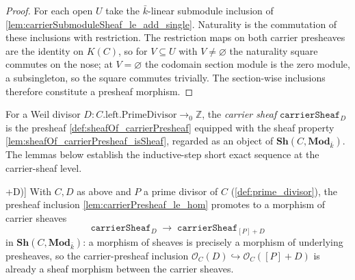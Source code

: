 \begin{proof}
  \leanok
  For each open \(U\) take the \(\bar k\)-linear submodule inclusion of
  \cref{lem:carrierSubmoduleSheaf_le_add_single}. Naturality is the
  commutation of these inclusions with restriction. The restriction maps on
  both carrier presheaves are the identity on \(K(C)\), so for
  \(V \subseteq U\) with \(V \neq \varnothing\) the naturality square
  commutes on the nose; at \(V = \varnothing\) the codomain section module is
  the zero module, a subsingleton, so the square commutes trivially. The
  section-wise inclusions therefore constitute a presheaf morphism.
\end{proof}

\begin{definition}

  \label{def:sheafOf_carrierSheaf}
  For a Weil divisor \(D : C.\text{left.PrimeDivisor} \to_0 \mathbb Z\), the
  \emph{carrier sheaf} \(\texttt{carrierSheaf}_D\) is the presheaf
  \cref{def:sheafOf_carrierPresheaf} equipped with the sheaf property
  \cref{lem:sheafOf_carrierPresheaf_isSheaf}, regarded as an object of
  \(\mathbf{Sh}(C, \mathbf{Mod}_{\bar k})\). The lemmas below establish
  the inductive-step short exact sequence at the carrier-sheaf level.
\end{definition}

\begin{definition}

\leanok
[Sheaf-level inclusion \(\mathcal O_C(D) \hookrightarrow \mathcal O_C([P]+D)\)]
  \label{def:sheafOf_carrierSheafHom_le_add_single}
  With \(C, D\) as above and \(P\) a prime divisor of \(C\)
  (\cref{def:prime_divisor}), the presheaf inclusion
  \cref{lem:carrierPresheaf_le_hom} promotes to a morphism of carrier sheaves
  \[
    \texttt{carrierSheaf}_D \;\longrightarrow\;
    \texttt{carrierSheaf}_{[P]+D}
  \]
  in \(\mathbf{Sh}(C, \mathbf{Mod}_{\bar k})\): a morphism of sheaves is
  precisely a morphism of underlying presheaves, so the carrier-presheaf
  inclusion \(\mathcal O_C(D) \hookrightarrow \mathcal O_C([P]+D)\) is already a
  sheaf morphism between the carrier sheaves.
\end{definition}


